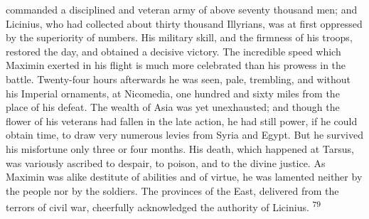 commanded a disciplined and veteran army of above seventy
thousand men; and Licinius, who had collected about thirty
thousand Illyrians, was at first oppressed by the superiority of
numbers. His military skill, and the firmness of his troops,
restored the day, and obtained a decisive victory. The incredible
speed which Maximin exerted in his flight is much more celebrated
than his prowess in the battle. Twenty-four hours afterwards he
was seen, pale, trembling, and without his Imperial ornaments, at
Nicomedia, one hundred and sixty miles from the place of his
defeat. The wealth of Asia was yet unexhausted; and though the
flower of his veterans had fallen in the late action, he had
still power, if he could obtain time, to draw very numerous
levies from Syria and Egypt. But he survived his misfortune only
three or four months. His death, which happened at Tarsus, was
variously ascribed to despair, to poison, and to the divine
justice. As Maximin was alike destitute of abilities and of
virtue, he was lamented neither by the people nor by the
soldiers. The provinces of the East, delivered from the terrors
of civil war, cheerfully acknowledged the authority of Licinius. \textsuperscript{79}




